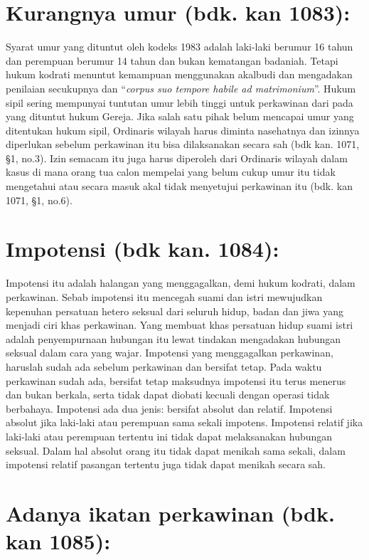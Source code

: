 
\setcounter{section}{0}
\section{Kurangnya umur (bdk. kan 1083):}

Syarat umur yang dituntut oleh kodeks 1983 adalah laki-laki berumur 16 tahun dan perempuan berumur 14 tahun dan bukan kematangan badaniah. Tetapi hukum kodrati menuntut kemampuan menggunakan akalbudi dan mengadakan penilaian secukupnya dan ``\textit{corpus suo tempore habile ad matrimonium}''. Hukum sipil sering mempunyai tuntutan umur lebih tinggi untuk perkawinan dari pada yang dituntut hukum Gereja. Jika salah satu pihak belum mencapai umur yang ditentukan hukum sipil, Ordinaris wilayah harus diminta nasehatnya dan izinnya diperlukan sebelum perkawinan itu bisa dilaksanakan secara sah (bdk kan. 1071, \S1, no.3). Izin semacam itu juga harus diperoleh dari Ordinaris wilayah dalam kasus di mana orang tua calon mempelai yang belum cukup umur itu tidak mengetahui atau secara masuk akal tidak menyetujui perkawinan itu (bdk. kan 1071, \S1, no.6).

\section{Impotensi (bdk kan. 1084):}

Impotensi itu adalah halangan yang menggagalkan, demi hukum kodrati, dalam perkawinan. Sebab impotensi itu mencegah suami dan istri mewujudkan kepenuhan persatuan hetero seksual dari seluruh hidup, badan dan jiwa yang menjadi ciri khas perkawinan. Yang membuat khas persatuan hidup suami istri adalah penyempurnaan hubungan itu lewat tindakan mengadakan hubungan seksual dalam cara yang wajar. Impotensi yang menggagalkan perkawinan, haruslah sudah ada sebelum perkawinan dan bersifat tetap. Pada waktu perkawinan sudah ada, bersifat tetap maksudnya impotensi itu terus menerus dan bukan berkala, serta tidak dapat diobati kecuali dengan operasi tidak berbahaya. Impotensi ada dua jenis: bersifat absolut dan relatif. Impotensi absolut jika laki-laki atau perempuan sama sekali impotens. Impotensi relatif jika laki-laki atau perempuan tertentu ini tidak dapat melaksanakan hubungan seksual. Dalam hal absolut orang itu tidak dapat menikah sama sekali, dalam impotensi relatif pasangan tertentu juga tidak dapat menikah secara sah.

\section{Adanya ikatan perkawinan (bdk. kan 1085):}

